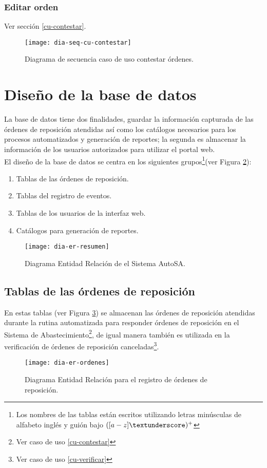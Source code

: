 \subsubsection{Editar orden}
Ver sección \ref{cu-contestar}.\\
\begin{figure}[h]
	\centering
	\texttt{[image: dia-seq-cu-contestar]}
	\caption{Diagrama de secuencia caso de uso contestar órdenes.}
	\label{fig:dia-seq-cu-contestar}
\end{figure}
\fi




\section{Diseño de la base de datos}
La base de datos tiene dos finalidades, guardar la información capturada de las órdenes de reposición atendidas así como los catálogos necesarios para los procesos automatizados y generación de reportes; la segunda es almacenar la información de los usuarios autorizados para utilizar el portal web.\\
El diseño de la base de datos se centra en los siguientes grupos\footnote{Los nombres de las tablas están escritos utilizando letras minúsculas de alfabeto inglés y guión bajo $([a-z]{\textunderscore})^+$}(ver Figura \ref{fig:dia-er-resumen}):
\begin{enumerate}
	\item Tablas de las órdenes de reposición.
	\item Tablas del registro de eventos.
	\item Tablas de los usuarios de la interfaz web.
	\item Catálogos para generación de reportes.
\end{enumerate}
\begin{figure}[h]
  \centering
  \texttt{[image: dia-er-resumen]}
  \caption{Diagrama Entidad Relación de el Sistema AutoSA.}
  \label{fig:dia-er-resumen}
\end{figure}


\subsection{Tablas de las órdenes de reposición}
En estas tablas (ver Figura \ref{fig:dia-er-ordenes}) se almacenan las órdenes de reposición atendidas durante la rutina automatizada para responder órdenes de reposición en el Sistema de Abastecimiento\footnote{Ver caso de uso \ref{cu-contestar}}, de igual manera también es utilizada en la verificación de órdenes de reposición canceladas\footnote{Ver caso de uso \ref{cu-verificar}}.
\begin{figure}[h]
  \centering
  \texttt{[image: dia-er-ordenes]} 
  \caption{Diagrama Entidad Relación para el registro de órdenes de reposición.}
  \label{fig:dia-er-ordenes}
\end{figure}
